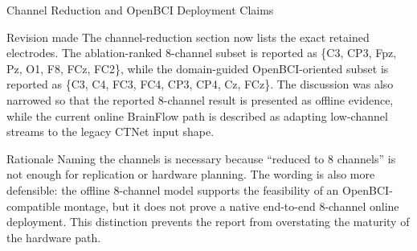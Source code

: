 \documentclass[UTF8,aspectratio=169,11pt]{ctexbeamer}
\begin{document}
\begin{frame}[t]{Channel Reduction and OpenBCI Deployment Claims}
\footnotesize

    \begin{block}{Revision made}
        The channel-reduction section now lists the exact retained electrodes. The ablation-ranked 8-channel subset is reported as \{C3, CP3, Fpz, Pz, O1, F8, FCz, FC2\}, while the domain-guided OpenBCI-oriented subset is reported as \{C3, C4, FC3, FC4, CP3, CP4, Cz, FCz\}. The discussion was also narrowed so that the reported 8-channel result is presented as offline evidence, while the current online BrainFlow path is described as adapting low-channel streams to the legacy CTNet input shape.
    \end{block}

    \vfill

    \begin{alertblock}{Rationale}
        Naming the channels is necessary because ``reduced to 8 channels'' is not enough for replication or hardware planning. The wording is also more defensible: the offline 8-channel model supports the feasibility of an OpenBCI-compatible montage, but it does not prove a native end-to-end 8-channel online deployment. This distinction prevents the report from overstating the maturity of the hardware path.
    \end{alertblock}

\end{frame}
\end{document}
